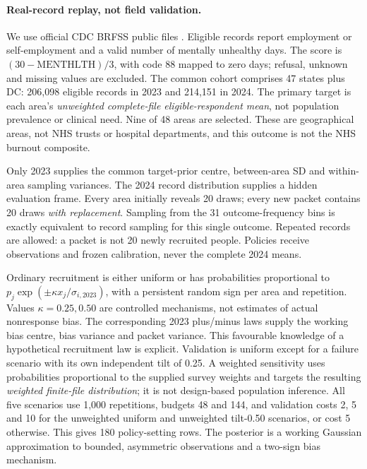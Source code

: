 \paragraph{Real-record replay, not field validation.}
We use official CDC BRFSS public files \citep{cdc2023,cdc2024}. Eligible records report employment or self-employment and a valid number of mentally unhealthy days. The score is $(30-\mathrm{MENTHLTH})/3$, with code 88 mapped to zero days; refusal, unknown and missing values are excluded. The common cohort comprises 47 states plus DC: 206,098 eligible records in 2023 and 214,151 in 2024. The primary target is each area's \emph{unweighted complete-file eligible-respondent mean}, not population prevalence or clinical need. Nine of 48 areas are selected. These are geographical areas, not NHS trusts or hospital departments, and this outcome is not the NHS burnout composite.

Only 2023 supplies the common target-prior centre, between-area SD and within-area sampling variances. The 2024 record distribution supplies a hidden evaluation frame. Every area initially reveals 20 draws; every new packet contains 20 draws \emph{with replacement}. Sampling from the 31 outcome-frequency bins is exactly equivalent to record sampling for this single outcome. Repeated records are allowed: a packet is not 20 newly recruited people. Policies receive observations and frozen calibration, never the complete 2024 means.

Ordinary recruitment is either uniform or has probabilities proportional to $p_j\exp(\pm\kappa x_j/\sigma_{i,2023})$, with a persistent random sign per area and repetition. Values $\kappa=0.25,0.50$ are controlled mechanisms, not estimates of actual nonresponse bias. The corresponding 2023 plus/minus laws supply the working bias centre, bias variance and packet variance. This favourable knowledge of a hypothetical recruitment law is explicit. Validation is uniform except for a failure scenario with its own independent tilt of 0.25. A weighted sensitivity uses probabilities proportional to the supplied survey weights and targets the resulting \emph{weighted finite-file distribution}; it is not design-based population inference. All five scenarios use 1,000 repetitions, budgets 48 and 144, and validation costs 2, 5 and 10 for the unweighted uniform and unweighted tilt-0.50 scenarios, or cost 5 otherwise. This gives 180 policy-setting rows. The posterior is a working Gaussian approximation to bounded, asymmetric observations and a two-sign bias mechanism.

